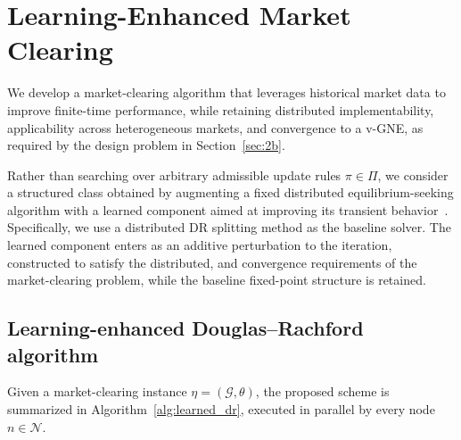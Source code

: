 \documentclass[final]{l4dc2026}
\begin{document}
\section{Learning-Enhanced Market Clearing}
\label{sec:learned_dr}
We develop a market-clearing algorithm that leverages historical market data to improve finite-time performance, while retaining distributed implementability, applicability across heterogeneous markets, and convergence to a v-GNE, as required by the design problem in Section~\ref{sec:2b}.

Rather than searching over arbitrary admissible update rules $\pi\in\Pi$, we consider a structured class obtained by augmenting a fixed distributed equilibrium-seeking algorithm with a learned component aimed at improving its transient behavior~\citep{martin_learning_2026}.
Specifically, we use a distributed DR splitting method as the baseline solver. The learned component enters as an additive perturbation to the iteration, constructed to satisfy the distributed, and convergence requirements of the market-clearing problem, while the baseline fixed-point structure is retained.

\subsection{Learning-enhanced Douglas--Rachford algorithm} \label{sec:3a}

Given a market-clearing instance $\eta = (\mathcal{G}, \theta)$, the proposed scheme is summarized in Algorithm~\ref{alg:learned_dr}, executed in parallel by every node $n\in\mathcal{N}$.
\end{document}
